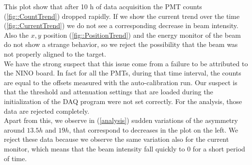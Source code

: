 This plot show that after 10 h of data acquisition the PMT counts (\ref{fig::CountTrend}) dropped rapidly. If we show the current trend over the time (\ref{fig::CurrentTrend}) we do not see a corresponding decrease in beam intensity. Also the $x,y$ position (\ref{fig::PositionTrend}) and the energy monitor of the beam do not show a strange behavior, so we reject the possibility that the beam was not properly aligned to the target. \\
We have the strong suspect that this issue come from a failure to be attributed to the NINO board. In fact for all the PMTs, during that time interval, the  counts are equal to the offsets measured with the auto-calibration run. Our suspect is that the threshold and attenuation settings that are loaded during the initialization of the DAQ program were not set correctly. For the analysis, those data are rejected completely.\\
Apart from this, we observe in (\ref{analysis}) sudden variations of the asymmetry around $13.5 h$ and $19 h$, that correspond to decreases in the plot on the left. We reject these data because we observe the same variation also for the current monitor, which means that the beam intensity fall quickly to $0$ for a short period of time. 

\begin{figure}[hbtp]
\centering
{}
\end{figure}

